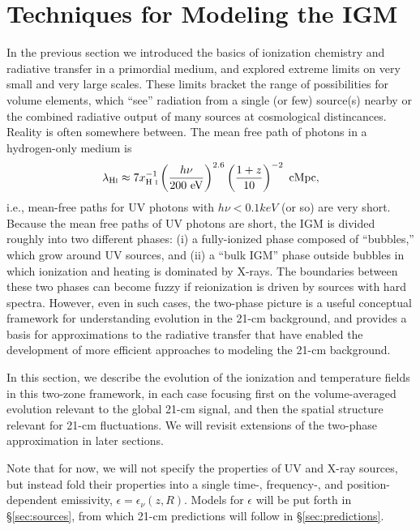 \section{Techniques for Modeling the IGM} \label{sec:techniques}
In the previous section we introduced the basics of ionization chemistry and radiative transfer in a primordial medium, and explored extreme limits on very small and very large scales. These limits bracket the range of possibilities for volume elements, which ``see'' radiation from a single (or few) source(s) nearby or the combined radiative output of many sources at cosmological distincances. {\color{red} Reality is often somewhere between.} The mean free path of photons in a hydrogen-only medium is \cite{McQuinn2012}
\begin{equation}
	\lambda_{\text{H} {\textsc{i}}} \approx 7 x_{\text{H } \textsc{i}}^{-1} \left(\frac{h\nu}{200 \ \mathrm{eV}} \right)^{2.6} \left(\frac{1+z}{10} \right)^{-2} \ \mathrm{cMpc} \label{eq:mfp},
\end{equation}
i.e., mean-free paths for UV photons with $h\nu < 0.1 keV$ (or so) are very short. Because the mean free paths of UV photons are short, the IGM is divided roughly into two different phases: (i) a fully-ionized phase composed of ``bubbles,'' which grow around UV sources, and (ii) a ``bulk IGM'' phase outside bubbles in which ionization and heating is dominated by X-rays. The boundaries between these two phases can become fuzzy if reionization is driven by sources with hard spectra. However, even in such cases, the two-phase picture is a useful conceptual framework for understanding evolution in the 21-cm background, and provides a basis for approximations to the radiative transfer that have enabled the development of more efficient approaches to modeling the 21-cm background. 

In this section, we describe the evolution of the ionization and temperature fields in this two-zone framework, in each case focusing first on the volume-averaged evolution relevant to the global 21-cm signal, and then the spatial structure relevant for 21-cm fluctuations. We will revisit extensions of the two-phase approximation in later sections.

Note that for now, we will not specify the properties of UV and X-ray sources, but instead fold their properties into a single time-, frequency-, and position-dependent emissivity, $\epsilon = \epsilon_{\nu}(z,R)$. Models for $\epsilon$ will be put forth in \S\ref{sec:sources}, from which 21-cm predictions will follow in \S\ref{sec:predictions}. 


